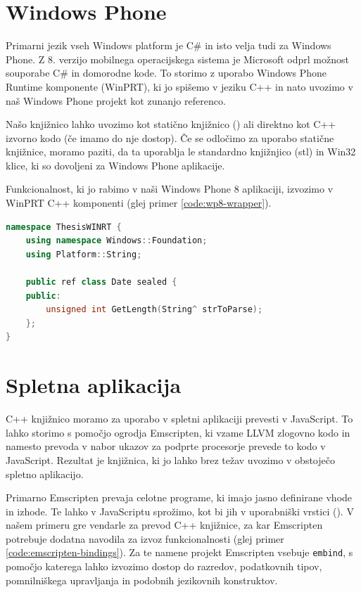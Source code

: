 \section{Windows Phone}

Primarni jezik vseh Windows platform je C\# in isto velja tudi za Windows Phone. Z 8. verzijo mobilnega operacijskega sistema je Microsoft odprl možnost souporabe C\# in domorodne kode. To storimo z uporabo Windows Phone Runtime komponente (WinPRT), ki jo spišemo v jeziku C++ in nato uvozimo v naš Windows Phone projekt kot zunanjo referenco.

Našo knjižnico lahko uvozimo kot statično knjižnico () ali direktno kot C++ izvorno kodo (če imamo do nje dostop). Če se odločimo za uporabo statične knjižnice, moramo paziti, da ta uporablja le standardno knjižnjico (\gls{stl}) in Win32 klice, ki so dovoljeni za Windows Phone aplikacije\cite{windows-static}.

Funkcionalnost, ki jo rabimo v naši Windows Phone 8 aplikaciji, izvozimo v WinPRT C++ komponenti (glej primer \ref{code:wp8-wrapper}).

\lstset{language=[Sharp]C, breaklines}
\begin{lstlisting}[caption={C++ koda za izvoz funkcionalnosti knjižnice v JavaScript razreda \texttt{Date}.}, label=code:wp8-wrapper, language=c++]
namespace ThesisWINRT {
    using namespace Windows::Foundation;
    using Platform::String;

    public ref class Date sealed {
    public:
        unsigned int GetLength(String^ strToParse);
    };
}
\end{lstlisting}

\section{Spletna aplikacija}

C++ knjižnico moramo za uporabo v spletni aplikaciji prevesti v JavaScript. To lahko storimo s pomočjo ogrodja Emscripten, ki vzame LLVM zlogovno kodo in namesto prevoda v nabor ukazov za podprte procesorje prevede to kodo v JavaScript. Rezultat je knjižnica, ki jo lahko brez težav uvozimo v obstoječo spletno aplikacijo.

Primarno Emscripten prevaja celotne programe, ki imajo jasno definirane vhode in izhode. Te lahko v JavaScriptu sprožimo, kot bi jih v uporabniški vrstici (). V našem primeru gre vendarle za prevod C++ knjižnice, za kar Emscripten potrebuje dodatna navodila za izvoz funkcionalnosti (glej primer \ref{code:emscripten-bindings}). Za te namene projekt Emscripten vsebuje \texttt{embind}\cite{emscripten-embind}, s pomočjo katerega lahko izvozimo dostop do razredov, podatkovnih tipov, pomnilniškega upravljanja in podobnih jezikovnih konstruktov.

